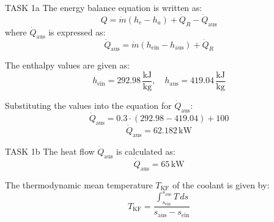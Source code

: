TASK 1a  
The energy balance equation is written as:  
\[
Q = \dot{m} (h_e - h_a) + \dot{Q}_R - \dot{Q}_{\text{aus}}
\]  
where \( \dot{Q}_{\text{aus}} \) is expressed as:  
\[
\dot{Q}_{\text{aus}} = \dot{m} (h_{\text{ein}} - h_{\text{aus}}) + \dot{Q}_R
\]  

The enthalpy values are given as:  
\[
h_{\text{ein}} = 292.98 \, \frac{\text{kJ}}{\text{kg}}, \quad h_{\text{aus}} = 419.04 \, \frac{\text{kJ}}{\text{kg}}
\]  

Substituting the values into the equation for \( \dot{Q}_{\text{aus}} \):  
\[
\dot{Q}_{\text{aus}} = 0.3 \cdot (292.98 - 419.04) + 100
\]  
\[
\dot{Q}_{\text{aus}} = 62.182 \, \text{kW}
\]  

TASK 1b  
The heat flow \( \dot{Q}_{\text{aus}} \) is calculated as:  
\[
\dot{Q}_{\text{aus}} = 65 \, \text{kW}
\]  

The thermodynamic mean temperature \( T_{\text{KF}} \) of the coolant is given by:  
\[
T_{\text{KF}} = \frac{\int_{s_{\text{ein}}}^{s_{\text{aus}}} T \, ds}{s_{\text{aus}} - s_{\text{ein}}}
\]  